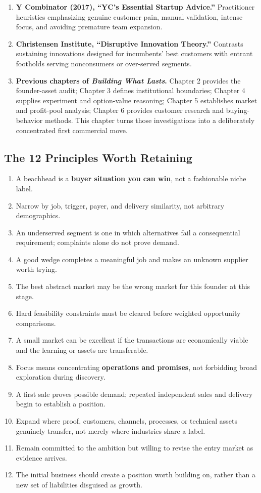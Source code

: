 \begin{enumerate}
    \item[\textbf{[R10]}] \textbf{Y Combinator (2017), ``YC's Essential Startup Advice.''} Practitioner heuristics emphasizing genuine customer pain, manual validation, intense focus, and avoiding premature team expansion.
    \item[\textbf{[R11]}] \textbf{Christensen Institute, ``Disruptive Innovation Theory.''} Contrasts sustaining innovations designed for incumbents' best customers with entrant footholds serving nonconsumers or over-served segments.
    \item[\textbf{[R12]}] \textbf{Previous chapters of \emph{Building What Lasts}.} Chapter 2 provides the founder-asset audit; Chapter 3 defines institutional boundaries; Chapter 4 supplies experiment and option-value reasoning; Chapter 5 establishes market and profit-pool analysis; Chapter 6 provides customer research and buying-behavior methods. This chapter turns those investigations into a deliberately concentrated first commercial move.
\end{enumerate}

\subsection*{The 12 Principles Worth Retaining}

\begin{enumerate}
    \item A beachhead is a \textbf{buyer situation you can win}, not a fashionable niche label.
    \item Narrow by job, trigger, payer, and delivery similarity, not arbitrary demographics.
    \item An underserved segment is one in which alternatives fail a consequential requirement; complaints alone do not prove demand.
    \item A good wedge completes a meaningful job and makes an unknown supplier worth trying.
    \item The best abstract market may be the wrong market for this founder at this stage.
    \item Hard feasibility constraints must be cleared before weighted opportunity comparisons.
    \item A small market can be excellent if the transactions are economically viable and the learning or assets are transferable.
    \item Focus means concentrating \textbf{operations and promises}, not forbidding broad exploration during discovery.
    \item A first sale proves possible demand; repeated independent sales and delivery begin to establish a position.
    \item Expand where proof, customers, channels, processes, or technical assets genuinely transfer, not merely where industries share a label.
    \item Remain committed to the ambition but willing to revise the entry market as evidence arrives.
    \item The initial business should create a position worth building on, rather than a new set of liabilities disguised as growth.
\end{enumerate}

